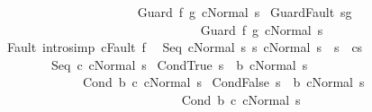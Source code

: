 \begin{isabellebody}
\ \ \ \ \ \ \ \ \ \ {\isasymLongrightarrow}\ \isanewline
\ \ \ \ \ \ \ \ \ \ {\isasymGamma}{\isasymturnstile}Guard\ f\ g\ c{\isasymdown}{\isacharparenleft}Normal\ s{\isacharparenright}{\isachardoublequoteclose}\isanewline
\isanewline
{\isacharbar}\ GuardFault{\isacharcolon}\ {\isachardoublequoteopen}s{\isasymnotin}g\ \ \isanewline
\ \ \ \ \ \ \ \ \ \ \ \ \ \ \ {\isasymLongrightarrow}\ \isanewline
\ \ \ \ \ \ \ \ \ \ \ \ \ \ \ {\isasymGamma}{\isasymturnstile}Guard\ f\ g\ c{\isasymdown}{\isacharparenleft}Normal\ s{\isacharparenright}{\isachardoublequoteclose}\isanewline
\isanewline
\isanewline
{\isacharbar}\ Fault\ {\isacharbrackleft}intro{\isacharcomma}simp{\isacharbrackright}{\isacharcolon}\ {\isachardoublequoteopen}{\isasymGamma}{\isasymturnstile}c{\isasymdown}Fault\ f{\isachardoublequoteclose}\ \isanewline
\isanewline
\isanewline
{\isacharbar}\ Seq{\isacharcolon}\ {\isachardoublequoteopen}{\isasymlbrakk}{\isasymGamma}{\isasymturnstile}cNormal\ s{\isacharsemicolon}\ {\isasymforall}s{\isacharprime}{\isachardot}\ {\isasymGamma}{\isasymturnstile}{\isasymlangle}cNormal\ s{\isasymrangle}\ {\isasymRightarrow}\ s{\isacharprime}\ {\isasymlongrightarrow}\ {\isasymGamma}{\isasymturnstile}cs{\isacharprime}{\isasymrbrakk}\isanewline
\ \ \ \ \ \ \ \ {\isasymLongrightarrow}\isanewline
\ \ \ \ \ \ \ \ {\isasymGamma}{\isasymturnstile}Seq\ c\ cNormal\ s{\isacharparenright}{\isachardoublequoteclose}\isanewline
\isanewline
{\isacharbar}\ CondTrue{\isacharcolon}\ {\isachardoublequoteopen}{\isasymlbrakk}s\ {\isasymin}\ b{\isacharsemicolon}\ {\isasymGamma}{\isasymturnstile}cNormal\ s{\isacharparenright}{\isasymrbrakk}\ \isanewline
\ \ \ \ \ \ \ \ \ \ \ \ \ {\isasymLongrightarrow}\ \ \isanewline
\ \ \ \ \ \ \ \ \ \ \ \ \ {\isasymGamma}{\isasymturnstile}Cond\ b\ c\ cNormal\ s{\isacharparenright}{\isachardoublequoteclose}\isanewline
\isanewline
\isanewline
{\isacharbar}\ CondFalse{\isacharcolon}\ {\isachardoublequoteopen}{\isasymlbrakk}s\ {\isasymnotin}\ b{\isacharsemicolon}\ {\isasymGamma}{\isasymturnstile}cNormal\ s{\isacharparenright}{\isasymrbrakk}\ \isanewline
\ \ \ \ \ \ \ \ \ \ \ \ \ {\isasymLongrightarrow}\ \ \isanewline
\ \ \ \ \ \ \ \ \ \ \ \ \ {\isasymGamma}{\isasymturnstile}Cond\ b\ c\ cNormal\ s{\isacharparenright}{\isachardoublequoteclose}\isanewline

\end{isabellebody}
